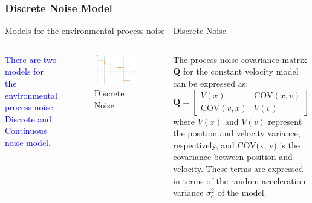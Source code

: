 \subsubsection{Discrete Noise Model}
\begin{frame}{Models for the environmental process noise - Discrete Noise}
\begin{columns}
    \textcolor{blue}{There are two models for the environmental process noise; Discrete and Continuous noise model.}
    \begin{figure}
        \centering
        \includegraphics[width=0.6\linewidth]{Figures//Chapter2/DiscreteNoise.png}
        \vspace{-10pt}
        \caption{Discrete Noise}
        \vspace{-10pt}
        \label{fig:DiscreteNoise}
    \end{figure}
    The process noise covariance matrix \(\mathbf{Q}\) for the constant velocity model can be expressed as:
\begin{equation*}
\mathbf{Q} = 
\begin{bmatrix}
V(x) & \text{COV}(x, v) \\
\text{COV}(v, x) & V(v)
\end{bmatrix}
\end{equation*}
where \(V(x)\) and \(V(v)\) represent the position and velocity variance, respectively, and COV(x, v) is the covariance between position and velocity. These terms are expressed in terms of the random acceleration variance \(\sigma_a^2\) of the model.


\end{columns}
\end{frame}
